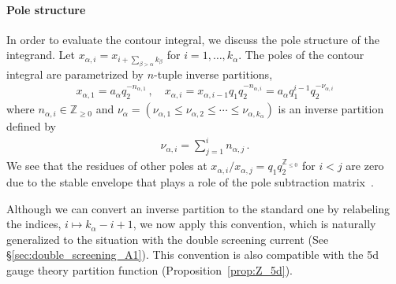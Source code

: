 \paragraph{Pole structure}
In order to evaluate the contour integral, we discuss the pole structure of the integrand.
Let $x_{\alpha,i} = x_{i+\sum_{\beta > \alpha}k_\beta}$ for $i = 1,\ldots, k_\alpha$.
The poles of the contour integral are parametrized by $n$-tuple inverse partitions,
\begin{align}
    x_{\alpha,1} = a_\alpha q_2^{-n_{\alpha,1}} 
    \, , \quad 
    x_{\alpha,i} = x_{\alpha,i-1} q_1 q_2^{-n_{\alpha,i}} = a_\alpha q_1^{i-1} q_2^{-\nu_{\alpha,i}}
\end{align}
where $n_{\alpha,i} \in \mathbb{Z}_{\ge 0}$ and $\nu_\alpha = (\nu_{\alpha,1} \le \nu_{\alpha,2} \le \cdots \le \nu_{\alpha,k_\alpha})$ is an inverse partition defined by
\begin{align}
    \nu_{\alpha,i} = \sum_{j=1}^i n_{\alpha,j} \, .
\end{align}
We see that the residues of other poles at $x_{\alpha,i}/x_{\alpha,j} = q_1 q_2^{\mathbb{Z}_{\le 0}}$ for $i < j$ are zero due to the stable envelope that plays a role of the pole subtraction matrix~\cite{Aganagic:2016jmx}.
\begin{remark}
Although we can convert an inverse partition to the standard one by relabeling the indices, $i \mapsto k_\alpha - i + 1$, we now apply this convention, which is naturally generalized to the situation with the double screening current (See \S\ref{sec:double_screening_A1}).
This convention is also compatible with the 5d gauge theory partition function (Proposition~\ref{prop:Z_5d}).
\end{remark}


